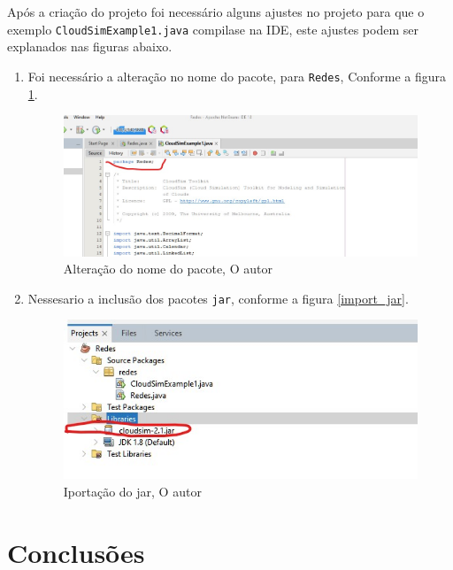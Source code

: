 \par Após a criação do projeto foi necessário alguns ajustes no projeto para que o exemplo \verb#CloudSimExample1.java# compilase na IDE, este ajustes podem ser explanados nas figuras abaixo.

\begin{enumerate}[label=\Roman{*}, ref=(\roman{*})]
  \item Foi necessário a alteração no nome do pacote, para \verb#Redes#, Conforme a figura \ref{fig:rename_pacote}. \newline
  \begin{figure}
    \center
    \includegraphics[scale=.5]{figure/rename_pacote.jpg}
    \caption{Alteração do nome do pacote, O autor}
    \label{fig:rename_pacote}
  \end{figure}

  \item Nessesario a inclusão dos pacotes \verb#jar#, conforme a figura \ref{import_jar}. \newline
  \begin{figure}
    \center
    \includegraphics[scale=.8]{figure/import_jar.jpg}
    \caption{Iportação do jar, O autor}
    \label{fig:import_jar}
  \end{figure}
\end{enumerate}


\section{Conclusões}

